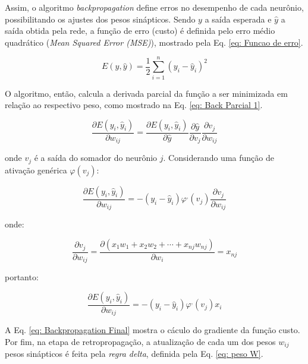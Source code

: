 Assim, o algoritmo \textit{backpropagation} define erros no desempenho de cada neurônio, possibilitando os ajustes dos pesos sinápticos. Sendo $y$ a saída esperada e $\hat{y}$ a saída obtida pela rede, a função de erro (custo) é definida pelo erro médio quadrático (\textit{Mean Squared Error (MSE)}), mostrado pela Eq. \ref{eq: Funcao de erro}.

\begin{equation}    \label{eq: Funcao de erro}
    E({y,\hat{y}}) = \frac{1}{2}\sum_{i=1}^{n}\left ( y_{i} - \hat{y}_{i} \right )^{2}
\end{equation}

O algoritmo, então, calcula a derivada parcial da função a ser minimizada em relação ao respectivo peso, como mostrado na Eq. \ref{eq: Back Parcial 1}.

\begin{equation}    \label{eq: Back Parcial 1}
    \frac{\partial E(y_{i},\hat{y}_{i})}{\partial w_{ij}} = \frac{\partial E(y_{i},\hat{y}_{i})}{\partial \hat{y}} \frac{\partial \hat{y}}{\partial v_{j}} \frac{\partial v_{j}}{\partial w_{ij}}
\end{equation}

\noindent
onde $v_{j}$ é a saída do somador do neurônio $j$. Considerando uma função de ativação genérica $\varphi(v_{j})$:

\begin{equation}
    \frac{\partial E(y_{i},\hat{y}_{i})}{\partial w_{ij}} = - \left ( y_{i} - \hat{y}_{i} \right ) \varphi^{,}(v_{j}) \frac{\partial v_{j}}{\partial w_{ij}}
\end{equation}

\noindent
onde:

\begin{equation}
    \frac{\partial v_{j}}{\partial w_{ij}} = \frac{\partial (x_{1}w_{1} + x_{2}w_{2} + \cdots + x_{nj}w_{nj})}{\partial w_{i}} = x_{nj}
\end{equation}

\noindent
portanto:

\begin{equation}    \label{eq: Backpropagation Final}
    \frac{\partial E(y_{i},\hat{y}_{i})}{\partial w_{ij}} = - \left ( y_{i} - \hat{y}_{i} \right ) \varphi^{,}(v_{j}) x_{i}
\end{equation}

A Eq. \ref{eq: Backpropagation Final} mostra o cáculo do gradiente da função custo. Por fim, na etapa de retropropagação, a atualização de cada um dos pesos $w_{ij}$ pesos sinápticos é feita pela \textit{regra delta}, definida pela Eq. \ref{eq: peso W}.

